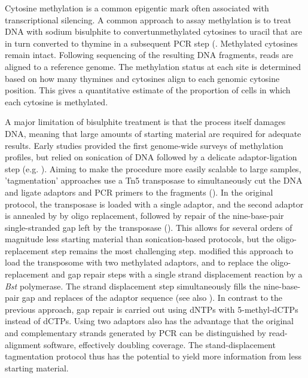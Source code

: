 \documentclass[12pt,longbibliography]{article}
\begin{document}
Cytosine methylation is a common epigentic mark often associated with transcriptional silencing.
A common approach to assay methylation is to treat DNA with sodium bisulphite to convertunmethylated cytosines to uracil that are in turn converted to thymine in a subsequent PCR step (\cite{clark1994high}.
Methylated cytosines remain intact.
Following sequencing of the resulting DNA fragments, reads are aligned to a reference genome.
The methylation status at each site is determined based on how many thymines and cytosines align to each genomic cytosine position.
This gives a quantitative estimate of the proportion of cells in which each cytosine is methylated.

A major limitation of bisulphite treatment is that the process itself damages DNA, meaning that large amounts of starting material are required for adequate results.
Early studies provided the first genome-wide surveys of methylation profiles, but relied on sonication of DNA followed by a delicate adaptor-ligation step (e.g. \cite{meissner2005reduced, cokus2008shotgun, lister2009human}).
Aiming to make the procedure more easily scalable to large samples, 'tagmentation' approaches use a Tn5 transposase to simultaneously cut the DNA and ligate adaptors and PCR primers to the fragments (\cite{wang2013tagmentation}).
In the original protocol, the transposase is loaded with a single adaptor, and the second adaptor is annealed by by oligo replacement, followed by repair of the nine-base-pair single-stranded gap left by the transposase (\cite{adey2012ultra}).
This allows for several orders of magnitude less starting material than sonication-based protocols, but the oligo-replacement step remains the most challenging step.
\textcite{lu2015improved} modified this approach to load the transposome with two methylated adaptors, and to replace the oligo-replacement and gap repair steps with a single strand displacement reaction by a \textit{Bst} polymerase.
The strand displacement step simultaneously fills the nine-base-pair gap and replaces of the adaptor sequence (see also \cite{weichenhan2018tagmentation, suzuki2018whole}).
In contrast to the previous approach, gap repair is carried out using dNTPs with 5-methyl-dCTPs instead of dCTPs.
Using two adaptors also has the advantage that the original and complementary strands generated by PCR can be distinguished by read-alignment software, effectively doubling coverage. 
The stand-displacement tagmentation protocol thus has the potential to yield more information from less starting material.
\end{document}
